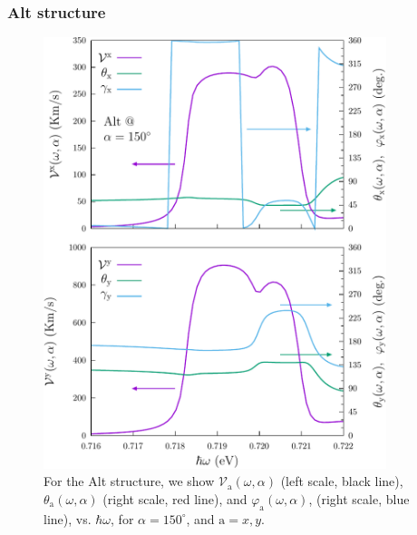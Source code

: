 \documentclass[floatfix,prb,aps,superscriptaddress,showpacs,11pt,preprint,letterpaper]{revtex4}
\def\tama{10cm}
\begin{document}
\subsubsection{Alt structure}

\begin{figure}[tb]
\centering
\includegraphics[width=\tama]{figures/fig9}
\caption{For the Alt structure, we show $\mathcal{V}_{\mathrm{a}}
(\omega,\alpha)$ (left scale, black line), $\theta_{\mathrm{a}} (\omega,\alpha)$
(right scale, red line), and $\varphi_{\mathrm{a}} (\omega,\alpha)$, (right
scale, blue line), vs. $\hbar\omega$, for $\alpha=150^\circ$, and $\mathrm{a} =
x,y$. }
\label{fig:alt-vx-vy-w1}
\end{figure}
\end{document}
